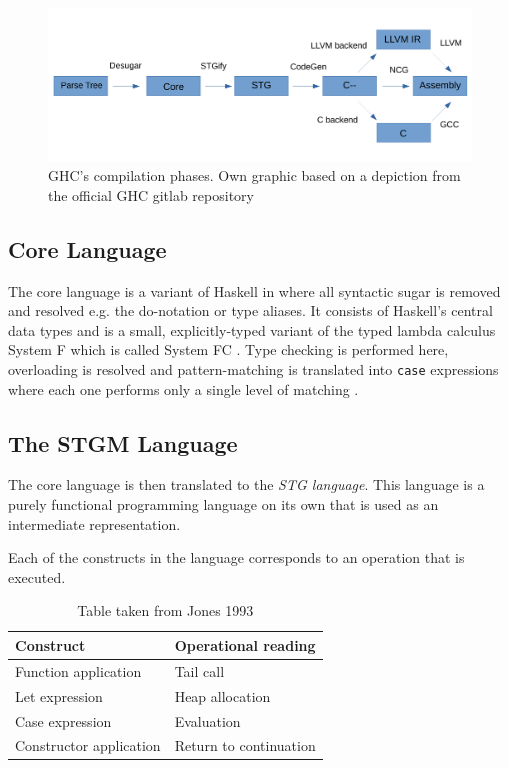 \documentclass[runningheads]{llncs}
\begin{document}
\begin{figure}

\centering
\includegraphics[width=12cm]{ghcflow.pdf}
\caption{GHC's compilation phases. Own graphic based on a depiction from the official GHC gitlab repository \protect\footnotemark}
\label{fig:ghc}
\end{figure}

\subsection{Core Language}
The core language is a variant of Haskell in where all syntactic sugar is removed and resolved e.g. the do-notation or type aliases. It consists of Haskell's central data types and is a small, explicitly-typed variant of the typed lambda calculus System F \cite{girard1986system} which is called System FC \cite{sulzmann2007system}. Type checking is performed here, overloading is resolved and pattern-matching is translated into \texttt{case} expressions where each one performs only a single level of matching \cite{jones1992implementing}.

\subsection{The STGM Language}
The core language is then translated to the \textit{STG language}.
This language is a purely functional programming language on its own that is used as an intermediate representation.

Each of the constructs in the language corresponds to an operation that is executed.

\begin{table}[H]
\centering

\begin{tabular}{|l|l|}
	\hline 
	Construct & Operational reading  \\ 
	\hline 
	Function application	& Tail call  \\  
	Let expression	& Heap allocation  \\ 
	Case expression	& Evaluation  \\ 
	Constructor application	& Return to continuation  \\ 
	\hline 
\end{tabular} 
\caption{Table taken from Jones 1993 \cite{jones1992implementing}}
\end{table}
\end{document}
